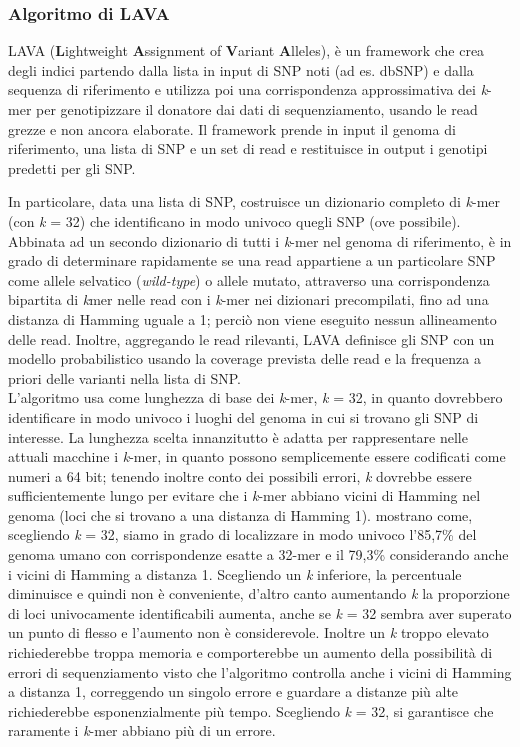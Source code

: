 \documentclass[../main.tex]{subfiles}
\begin{document}
\subsubsection{Algoritmo di LAVA}
LAVA (\textbf{L}ightweight \textbf{A}ssignment of \textbf{V}ariant \textbf{A}lleles), è un framework che crea degli indici partendo dalla lista in input di SNP noti (ad es. dbSNP) e dalla sequenza di riferimento e utilizza poi una corrispondenza approssimativa dei \textit{k}-mer per genotipizzare il donatore dai dati di sequenziamento, usando le read grezze e non ancora elaborate. Il framework prende in input il genoma di riferimento, una lista di SNP e un set di read e restituisce in output i genotipi predetti per gli SNP. 

In particolare, data una lista di SNP, costruisce un dizionario completo di \textit{k}-mer (con \textit{k} = 32) che identificano in modo univoco quegli SNP (ove possibile). Abbinata ad un secondo dizionario di tutti i \textit{k}-mer nel genoma di riferimento, è in grado di determinare rapidamente se una read appartiene a un particolare SNP come allele selvatico (\textit{wild-type}) o allele mutato, attraverso una corrispondenza bipartita di \textit{k}mer nelle read con i \textit{k}-mer nei dizionari precompilati, fino ad una distanza di Hamming uguale a 1; perciò non viene eseguito nessun allineamento delle read. Inoltre, aggregando le read rilevanti, LAVA definisce gli SNP con un modello probabilistico usando la coverage prevista delle read e la frequenza a priori delle varianti nella lista di SNP.\\

\noindent
L'algoritmo usa come lunghezza di base dei \textit{k}-mer, \textit{k} = 32, in quanto dovrebbero identificare in modo univoco i luoghi del genoma in cui si trovano gli SNP di interesse. La lunghezza scelta innanzitutto è adatta per rappresentare nelle attuali macchine i \textit{k}-mer, in quanto possono semplicemente essere codificati come numeri a 64 bit; tenendo inoltre conto dei possibili errori, \textit{k} dovrebbe essere sufficientemente lungo per evitare che i \textit{k}-mer abbiano vicini di Hamming nel genoma (loci che si trovano a una distanza di Hamming 1). \cite{shajii2016lava} mostrano come, scegliendo \textit{k} = 32, siamo in grado di localizzare in modo univoco l'85,7\% del genoma umano con corrispondenze esatte a 32-mer e il 79,3\% considerando anche i vicini di Hamming a distanza 1. Scegliendo un \textit{k} inferiore, la percentuale diminuisce e quindi non è conveniente, d'altro canto aumentando \textit{k} la proporzione di loci univocamente identificabili aumenta, anche se \textit{k} = 32 sembra aver superato un punto di flesso e l'aumento non è considerevole. Inoltre un \textit{k} troppo elevato richiederebbe troppa memoria e comporterebbe un aumento della possibilità di errori di sequenziamento visto che l'algoritmo controlla anche i vicini di Hamming a distanza 1, correggendo un singolo errore e guardare a distanze più alte richiederebbe esponenzialmente più tempo. Scegliendo \textit{k} = 32, si garantisce che raramente i \textit{k}-mer abbiano più di un errore.\\
\end{document}
